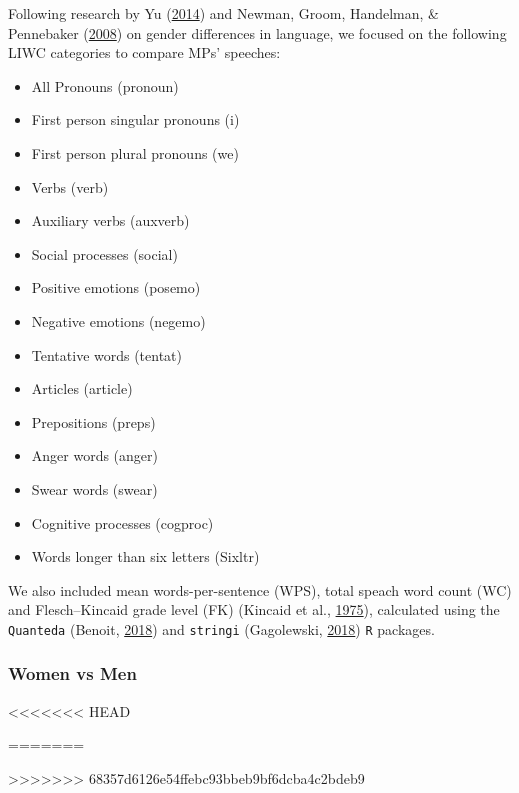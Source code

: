 \documentclass[]{article}
\providecommand{\tightlist}{%
  \setlength{\itemsep}{0pt}\setlength{\parskip}{0pt}}
\theoremstyle{definition}
\theoremstyle{definition}
\theoremstyle{definition}
\theoremstyle{remark}
\begin{document}
\begin{table}[H]
\begin{table}[H]
Following research by Yu (\protect\hyperlink{ref-yu2014}{2014}) and
Newman, Groom, Handelman, \& Pennebaker
(\protect\hyperlink{ref-newman2008}{2008}) on gender differences in
language, we focused on the following LIWC categories to compare MPs'
speeches:

\begin{itemize}
\tightlist
\item
  All Pronouns (pronoun)
\item
  First person singular pronouns (i) 
\item
  First person plural pronouns (we)
\item
  Verbs (verb)
\item
  Auxiliary verbs (auxverb) 
\item
  Social processes (social) 
\item
  Positive emotions (posemo) 
\item
  Negative emotions (negemo) 
\item
  Tentative words (tentat)
\item
  Articles (article) 
\item
  Prepositions (preps) 
\item
  Anger words (anger)
\item
  Swear words (swear)
\item
  Cognitive processes (cogproc)
\item
  Words longer than six letters (Sixltr)
\end{itemize}

We also included mean words-per-sentence (WPS), total speach word count
(WC) and Flesch--Kincaid grade level (FK) (Kincaid et al.,
\protect\hyperlink{ref-kincaid1975}{1975}), calculated using the
\texttt{Quanteda} (Benoit, \protect\hyperlink{ref-benoit2018}{2018}) and
\texttt{stringi} (Gagolewski,
\protect\hyperlink{ref-gagolewski2018}{2018}) \texttt{R} packages.

\hypertarget{women-vs-men}{%
\subsubsection{Women vs Men}\label{women-vs-men}}

<<<<<<< HEAD
\begin{table}[H]
=======
\begin{table}
>>>>>>> 68357d6126e54ffebc93bbeb9bf6dcba4c2bdeb9


\end{table}
\end{table}
\end{table}
\end{table}
\end{document}
